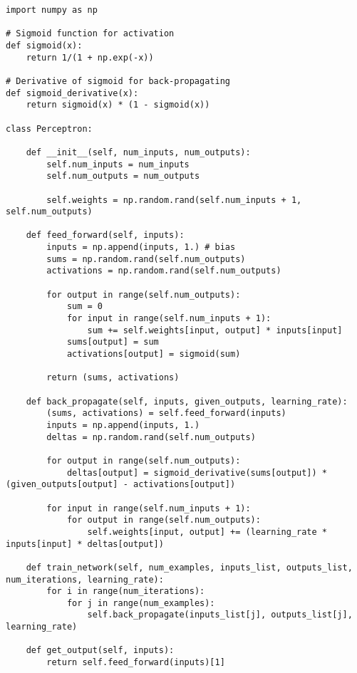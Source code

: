\documentclass[11pt]{article} %
\begin{document}
\begin{lstlisting}
import numpy as np

# Sigmoid function for activation
def sigmoid(x):
    return 1/(1 + np.exp(-x))
    
# Derivative of sigmoid for back-propagating
def sigmoid_derivative(x):
    return sigmoid(x) * (1 - sigmoid(x))
    
class Perceptron:

    def __init__(self, num_inputs, num_outputs):
        self.num_inputs = num_inputs
        self.num_outputs = num_outputs
        
        self.weights = np.random.rand(self.num_inputs + 1, self.num_outputs)
        
    def feed_forward(self, inputs):
        inputs = np.append(inputs, 1.) # bias
        sums = np.random.rand(self.num_outputs)
        activations = np.random.rand(self.num_outputs)
        
        for output in range(self.num_outputs):
            sum = 0
            for input in range(self.num_inputs + 1):
                sum += self.weights[input, output] * inputs[input]
            sums[output] = sum
            activations[output] = sigmoid(sum)
            
        return (sums, activations)
        
    def back_propagate(self, inputs, given_outputs, learning_rate):
        (sums, activations) = self.feed_forward(inputs)
        inputs = np.append(inputs, 1.)
        deltas = np.random.rand(self.num_outputs)
        
        for output in range(self.num_outputs):
            deltas[output] = sigmoid_derivative(sums[output]) * (given_outputs[output] - activations[output])
            
        for input in range(self.num_inputs + 1):
            for output in range(self.num_outputs):
                self.weights[input, output] += (learning_rate * inputs[input] * deltas[output])
                
    def train_network(self, num_examples, inputs_list, outputs_list, num_iterations, learning_rate):
        for i in range(num_iterations):
            for j in range(num_examples):
                self.back_propagate(inputs_list[j], outputs_list[j], learning_rate)  
                
    def get_output(self, inputs):
        return self.feed_forward(inputs)[1]
\end{lstlisting}
\end{document}
